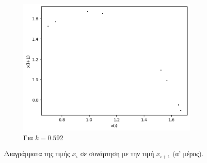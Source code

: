 \begin{figure}[ht]
\begin{subfigure}[b]{0.4\textwidth}
		\includegraphics[width=\textwidth]{LateX images/graphs q07/g7}
		\caption{Για $k=0.592$}
		\label{f:k41}
	\end{subfigure}
	\hfill
	\caption{Διαγράμματα της τιμής \(x_i\) σε συνάρτηση με την τιμή \(x_{i+1}\) (α' μέρος).}
\end{figure}

